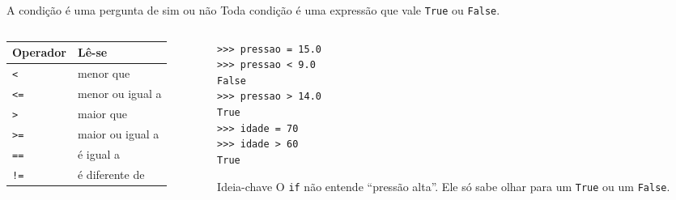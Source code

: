 \documentclass[aspectratio=169]{beamer}
\newcommand{\code}[1]{\texttt{\small #1}}
\begin{document}
\begin{frame}[fragile]{A condição é uma pergunta de sim ou não}
  Toda condição é uma expressão que vale \code{True} ou \code{False}.

  \vspace{0.3cm}
  \begin{columns}[T]
    \begin{column}{0.46\textwidth}
      \begin{center}
      \small
      \begin{tabular}{@{}ll@{}}
        \toprule
        \textbf{Operador} & \textbf{Lê-se} \\
        \midrule
        \code{<}  & menor que \\
        \code{<=} & menor ou igual a \\
        \code{>}  & maior que \\
        \code{>=} & maior ou igual a \\
        \code{==} & é igual a \\
        \code{!=} & é diferente de \\
        \bottomrule
      \end{tabular}
      \end{center}
    \end{column}
    \begin{column}{0.5\textwidth}
\begin{lstlisting}
>>> pressao = 15.0
>>> pressao < 9.0
False
>>> pressao > 14.0
True
>>> idade = 70
>>> idade > 60
True
\end{lstlisting}
      \begin{exampleblock}{Ideia-chave}
        O \code{if} não entende ``pressão alta''. Ele só sabe
        olhar para um \code{True} ou um \code{False}.
      \end{exampleblock}
    \end{column}
  \end{columns}
\end{frame}
\end{document}
